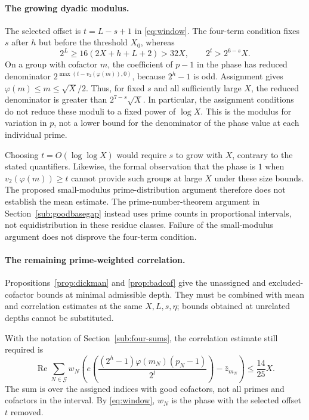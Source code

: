 \paragraph{The growing dyadic modulus.}
The selected offset is $t=L-s+1$ in \eqref{eq:window}. The four-term
condition fixes $s$ after $h$ but before the threshold $X_0$, whereas
\[
 2^L\ge16(2X+h+L+2)>32X,\qquad 2^t>2^{6-s}X.
\]
On a group with cofactor $m$, the coefficient of $p-1$ in the phase
has reduced denominator $2^{\max(t-v_2(\varphi(m)),0)}$, because $2^h-1$
is odd. Assignment gives
$\varphi(m)\le m\le\sqrt X/2$. Thus, for fixed $s$ and all sufficiently
large $X$, the reduced denominator is greater than
$2^{7-s}\sqrt X$. In particular, the assignment conditions do not reduce
these moduli to a fixed power of $\log X$. This is the modulus for
variation in $p$, not a lower bound for the denominator of the phase
value at each individual prime.

Choosing $t=O(\log\log X)$ would require $s$ to grow with $X$, contrary
to the stated quantifiers. Likewise, the formal observation that the phase
is $1$ when $v_2(\varphi(m))\ge t$ cannot provide such groups at large $X$
under these size bounds. The proposed small-modulus prime-distribution
argument therefore does not establish the mean estimate. The
prime-number-theorem argument in Section~\ref{sub:goodbasegap} instead
uses prime counts in proportional intervals, not equidistribution in
these residue classes. Failure of the small-modulus argument does not
disprove the four-term condition.

\paragraph{The remaining prime-weighted correlation.}
Propositions~\ref{prop:dickman} and \ref{prop:badcof} give the unassigned
and excluded-cofactor bounds at minimal admissible depth. They must be
combined with mean and correlation estimates at the same $X,L,s,\eta$;
bounds obtained at unrelated depths cannot be substituted.

With the notation of Section~\ref{sub:four-sums}, the correlation estimate
still required is
\[
 \operatorname{Re}\sum_{N\in\mathcal G}w_N
 \left(e\!\left(\frac{(2^h-1)\varphi(m_N)(p_N-1)}{2^t}\right)
       -\bar z_{m_N}\right)\le\frac{14}{25}X.
\]
The sum is over the assigned indices with good cofactors, not all primes
and cofactors in the interval. By \eqref{eq:window}, $w_N$ is the phase
with the selected offset $t$ removed.

